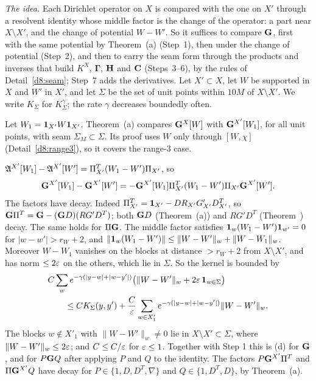 \begin{detail}\label{d8:35d}
\emph{The idea.} Each Dirichlet operator on $X$ is compared with the one on $X'$ through a resolvent identity whose middle factor is the change of the operator: a part near $X\setminus X'$, and the change of potential $W-W'$. So it suffices to compare $\mathbf G$, first with the same potential by Theorem~(a) (Step~1), then under the change of potential (Step~2), and then to carry the seam form through the products and inverses that build $K^X$, $\boldsymbol\Gamma$, $\mathbf H$ and $\mathbf C$ (Steps~3--6), by the rules of Detail~\ref{d8:seam}; Step~7 adds the derivatives.
Let $X'\subset X$, let $W$ be supported in $X$ and $W'$ in $X'$, and let $\Sigma$ be the set of unit points within $10M$ of $X\setminus X'$. We write $K_\Sigma$ for $K^{\gamma}_\Sigma$; the rate $\gamma$ decreases boundedly often.
\begin{step}
Let $W_1=\mathbf 1_{X'}W\mathbf 1_{X'}$. Theorem~(a) compares $\mathbf G^X[W]$ with $\mathbf G^{X'}[W_1]$, for all unit points, with seam $\Sigma_M\subset\Sigma$. Its proof uses $W$ only through $[W,\chi]$ (Detail~\ref{d8:range3}), so it covers the range-$3$ case.
\end{step}
\begin{step}
$\mathfrak A^{X'}[W_1]-\mathfrak A^{X'}[W']=\Pi_{X'}^T(W_1-W')\Pi_{X'}$, so
\[
\mathbf G^{X'}[W_1]-\mathbf G^{X'}[W']=-\mathbf G^{X'}[W_1]\Pi_{X'}^T(W_1-W')\Pi_{X'}\mathbf G^{X'}[W'] .
\]
The factors have decay. Indeed $\Pi_{X'}^T=\mathbf 1_{X'}-DR_{X'}G'_{X'}D^T_{X'}$, so $\mathbf G\Pi^T=\mathbf G-(\mathbf G D)(R G'D^T)$; both $\mathbf G D$ (Theorem~(a)) and $R G'D^T$ (Theorem~) decay. The same holds for $\Pi\mathbf G$. The middle factor satisfies $\mathbf 1_w(W_1-W')\mathbf 1_{w'}=0$ for $|w-w'|>r_W+2$, and $\|\mathbf 1_w(W_1-W')\|\le\|W-W'\|_w+\|W-W_1\|_w$. Moreover $W-W_1$ vanishes on the blocks at distance $>r_W+2$ from $X\setminus X'$, and has norm $\le2\varepsilon$ on the others, which lie in $\Sigma$. So the kernel is bounded by
\[
\begin{aligned}
&C\sum_we^{-\gamma(|y-w|+|w-y'|)}\big(\|W-W'\|_w+2\varepsilon\,\mathbf 1_{w\in\Sigma}\big)\\
&\qquad\le CK_\Sigma(y,y')+\frac C{\varepsilon}\sum_{w\in X'_1}e^{-\gamma(|y-w|+|w-y'|)}\|W-W'\|_w .
\end{aligned}
\]
The blocks $w\notin X'_1$ with $\|W-W'\|_w\ne0$ lie in $X\setminus X'\subset\Sigma$, where $\|W-W'\|_w\le2\varepsilon$; and $C\le C/\varepsilon$ for $\varepsilon\le1$. Together with Step 1 this is (d) for $\mathbf G$, and for $P\mathbf G Q$ after applying $P$ and $Q$ to the identity. The factors $P\mathbf G^{X'}\Pi^T$ and $\Pi\mathbf G^{X'}Q$ have decay for $P\in\{1,D,D^T,\nabla\}$ and $Q\in\{1,D^T,D\}$, by Theorem~(a).

\end{step}
\end{detail}

